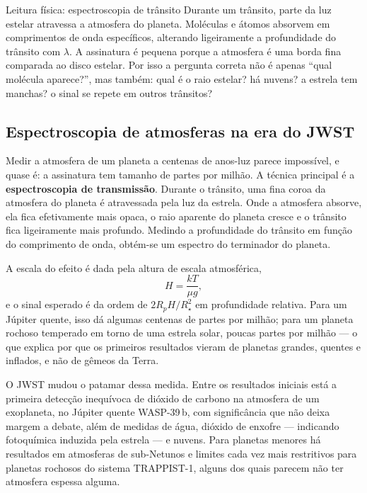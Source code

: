 \documentclass[11pt,a4paper]{article}
\begin{document}
\begin{lessonblock}{Leitura física: espectroscopia de trânsito}
Durante um trânsito, parte da luz estelar atravessa a atmosfera do planeta. Moléculas e átomos absorvem em comprimentos de onda específicos, alterando ligeiramente a profundidade do trânsito com $\lambda$. A assinatura é pequena porque a atmosfera é uma borda fina comparada ao disco estelar. Por isso a pergunta correta não é apenas ``qual molécula aparece?'', mas também: qual é o raio estelar? há nuvens? a estrela tem manchas? o sinal se repete em outros trânsitos?
\end{lessonblock}
\subsection*{Espectroscopia de atmosferas na era do JWST}

Medir a atmosfera de um planeta a centenas de anos-luz parece impossível, e quase é: a assinatura tem tamanho de partes por milhão. A técnica principal é a \textbf{espectroscopia de transmissão}. Durante o trânsito, uma fina coroa da atmosfera do planeta é atravessada pela luz da estrela. Onde a atmosfera absorve, ela fica efetivamente mais opaca, o raio aparente do planeta cresce e o trânsito fica ligeiramente mais profundo. Medindo a profundidade do trânsito em função do comprimento de onda, obtém-se um espectro do terminador do planeta.

A escala do efeito é dada pela altura de escala atmosférica,
\[
H=\frac{kT}{\mu g},
\]
e o sinal esperado é da ordem de $2R_pH/R_\star^{2}$ em profundidade relativa. Para um Júpiter quente, isso dá algumas centenas de partes por milhão; para um planeta rochoso temperado em torno de uma estrela solar, poucas partes por milhão --- o que explica por que os primeiros resultados vieram de planetas grandes, quentes e inflados, e não de gêmeos da Terra.

O JWST mudou o patamar dessa medida. Entre os resultados iniciais está a primeira detecção inequívoca de dióxido de carbono na atmosfera de um exoplaneta, no Júpiter quente WASP-39\,b, com significância que não deixa margem a debate, além de medidas de água, dióxido de enxofre --- indicando fotoquímica induzida pela estrela --- e nuvens. Para planetas menores há resultados em atmosferas de sub-Netunos e limites cada vez mais restritivos para planetas rochosos do sistema TRAPPIST-1, alguns dos quais parecem não ter atmosfera espessa alguma.
\end{document}
